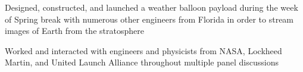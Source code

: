 \documentclass[letterpaper]{article}
\begin{document}
\begin{compactitem}
	\item Designed, constructed, and launched a weather balloon payload during the week of Spring break with numerous other engineers from Florida in order to stream images of Earth from the stratosphere\\
	\item Worked and interacted with engineers and physicists from NASA, Lockheed Martin, and United Launch Alliance throughout multiple panel discussions
\end{compactitem}


\noindent{\Large\textbf {\\ACHIEVEMENTS}}
\end{document}
